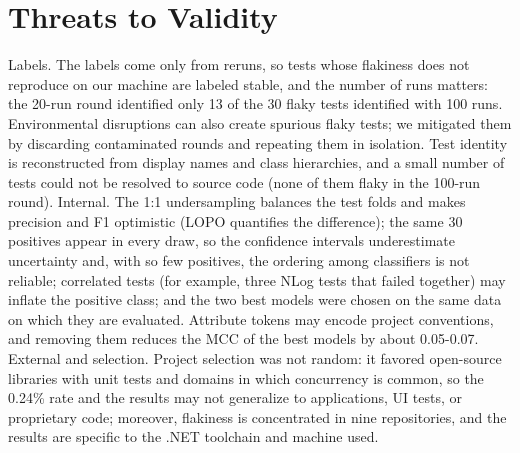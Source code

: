 \section{Threats to Validity}
Labels. The labels come only from reruns, so tests whose flakiness does not reproduce on our machine are labeled stable, and the number of runs matters: the 20-run round identified only 13 of the 30 flaky tests identified with 100 runs. Environmental disruptions can also create spurious flaky tests; we mitigated them by discarding contaminated rounds and repeating them in isolation. Test identity is reconstructed from display names and class hierarchies, and a small number of tests could not be resolved to source code (none of them flaky in the 100-run round). Internal. The 1:1 undersampling balances the test folds and makes precision and F1 optimistic (LOPO quantifies the difference); the same 30 positives appear in every draw, so the confidence intervals underestimate uncertainty and, with so few positives, the ordering among classifiers is not reliable; correlated tests (for example, three NLog tests that failed together) may inflate the positive class; and the two best models were chosen on the same data on which they are evaluated. Attribute tokens may encode project conventions, and removing them reduces the MCC of the best models by about 0.05-0.07. External and selection. Project selection was not random: it favored open-source libraries with unit tests and domains in which concurrency is common, so the 0.24\% rate and the results may not generalize to applications, UI tests, or proprietary code; moreover, flakiness is concentrated in nine repositories, and the results are specific to the .NET toolchain and machine used.